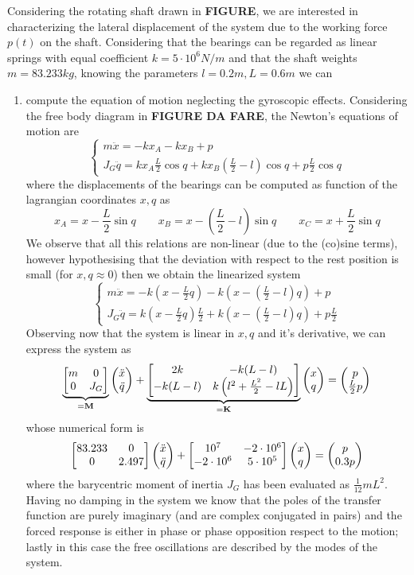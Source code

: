 		Considering the rotating shaft drawn in \textbf{FIGURE}, we are interested in characterizing the lateral displacement of the system due to the working force $p(t)$ on the shaft. Considering that the bearings can be regarded as linear springs with equal coefficient $k = 5\cdot 10^6 N/m$ and that the shaft weights $m = 83.233 kg$, knowing the parameters $l = 0.2m,L=0.6m$ we can
		\begin{enumerate}[\itshape i)]
			\item compute the equation of motion neglecting the gyroscopic effects. Considering the free body diagram in \textbf{FIGURE DA FARE}, the Newton's equations of motion are
			\[ \begin{cases}
				m \ddot x = - k x_A  - k x_B + p \\ J_G \ddot q = kx_A \frac L 2 \cos q + k x_B\left( \frac L2 - l \right) \cos q + p \frac L 2 \cos q
			\end{cases} \]
			where the displacements of the bearings can be computed as function of the lagrangian coordinates $x,q$ as
			\[ x_A = x - \frac L 2 \sin q \qquad x_B = x - \left( \frac L 2 - l \right) \sin q \qquad x_C = x + \frac L 2 \sin q \]
			We observe that all this relations are non-linear (due to the (co)sine terms), however hypothesising that the deviation with respect to the rest position is small (for $x,q\approx 0$) then we obtain the linearized system
			\[ \begin{cases}
				m\ddot x = - k \left( x - \frac L 2 q \right) - k \left( x - \left(\frac L 2 -l\right)q \right) + p \\
				J_G \ddot q = k \left(x-\frac L 2 q\right) \frac L 2 + k \left( x - \left( \frac L 2 - l\right) q \right) + p \frac L 2
			\end{cases} \]
			Observing now that the system is linear in $x,q$ and it's derivative, we can express the system as
			\[ \underbrace{\begin{bmatrix} m & 0 \\ 0 & J_G \end{bmatrix}}_{=\mathbf{M}} \begin{pmatrix} \ddot x \\ \ddot q \end{pmatrix} + \underbrace{\begin{bmatrix} 2k & - k(L-l) \\ -k(L-l) & k \left( l^2 + \frac {L^2}2 - lL \right)  \end{bmatrix}}_{=\mathbf{K}} \begin{pmatrix} x\\ q \end{pmatrix} = \begin{pmatrix} p \\ \frac L 2 p \end{pmatrix} \]
			whose numerical form is
			\[ \begin{bmatrix} 83.233 & 0 \\ 0 & 2.497 \end{bmatrix} \begin{pmatrix} \ddot  x \\ \ddot q \end{pmatrix} + \begin{bmatrix} 10^7 & -2\cdot 10^6 \\ -2 \cdot 10^6 & 5\cdot 10^5 \end{bmatrix} \begin{pmatrix} x \\ q \end{pmatrix} = \begin{pmatrix} p \\ 0.3p \end{pmatrix} \]
			where the barycentric moment of inertia $J_G$ has been evaluated as $\frac 1{12}mL^2$. \\
			Having no damping in the system we know that the poles of the transfer function are purely imaginary (and are complex conjugated in pairs) and the forced response is either in phase or phase opposition respect to the motion; lastly in this case the free oscillations are described by the modes of the system.
			

\end{enumerate}
